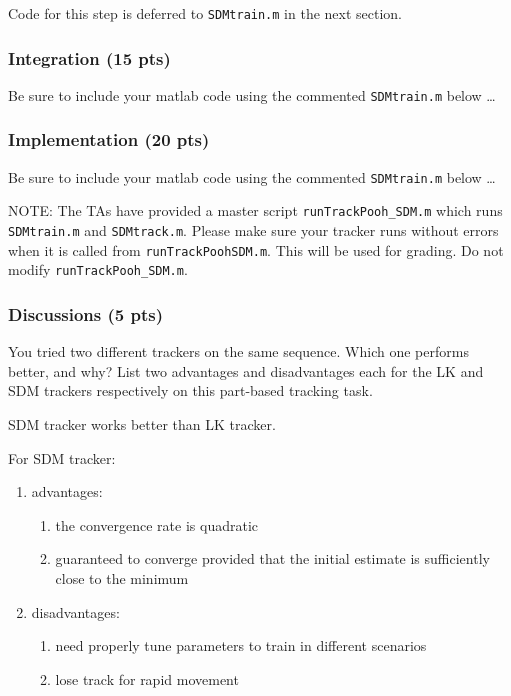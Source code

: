 \documentclass[12pt]{article}
\newcounter{list}
\begin{document}
Code for this step is deferred to \verb+SDMtrain.m+ in the next section.


\subsubsection{Integration (15 pts)\\}

Be sure to include your matlab code using the commented \verb+SDMtrain.m+  below \ldots



\subsubsection{Implementation (20 pts)\\}

Be sure to include your matlab code using the commented \verb+SDMtrain.m+  below \ldots


NOTE: The TAs have provided a master script \verb+runTrackPooh_SDM.m+ which runs \verb+SDMtrain.m+ and
\verb+SDMtrack.m+. Please make sure your tracker runs without errors when it is called from
\verb+runTrackPoohSDM.m+. This will be used for grading. Do not modify \verb+runTrackPooh_SDM.m+.

\subsubsection{Discussions (5 pts)}
\label{disc3}

You tried two different trackers on the same sequence. Which one performs better, and why? List two advantages and
disadvantages each for the LK and SDM trackers respectively on this part-based tracking task.

SDM tracker works better than LK tracker.

For SDM tracker:
\begin{enumerate}[I]
\item advantages:
	\begin{enumerate}[(1)]
	\item the convergence rate is quadratic
	\item guaranteed to converge provided that the initial estimate is sufficiently close to the minimum
	\end{enumerate}
\item disadvantages:
	\begin{enumerate}[(1)]
	\item need properly tune parameters to train in different scenarios
	\item lose track for rapid movement
	\end{enumerate}
\end{enumerate}
\end{document}
